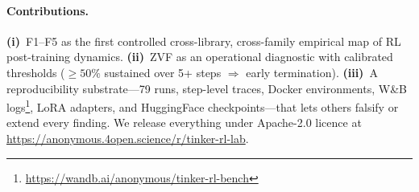 \paragraph{Contributions.}
\textbf{(i)}~F1--F5 as the first controlled cross-library, cross-family
empirical map of RL post-training dynamics.
\textbf{(ii)}~ZVF as an operational diagnostic with calibrated thresholds
($\geq 50\%$ sustained over 5+ steps $\Rightarrow$ early termination).
\textbf{(iii)}~A reproducibility substrate---79 runs, step-level traces,
Docker environments, W\&B logs\footnote{\url{https://wandb.ai/anonymous/tinker-rl-bench}},
LoRA adapters, and HuggingFace checkpoints---that lets others falsify or
extend every finding.
We release everything under Apache-2.0 licence at
\url{https://anonymous.4open.science/r/tinker-rl-lab}.
